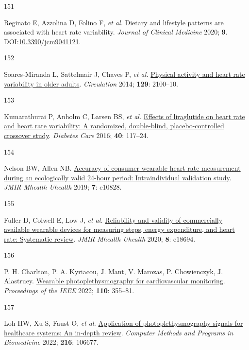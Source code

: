 \documentclass[
  letterpaper,
  headsepline=true,
  open=any]{scrbook}
\newlength{\cslhangindent}
\newlength{\csllabelwidth}
\newlength{\cslentryspacingunit} %
\newenvironment{CSLReferences}[2] %
 {%
  \setlength{\parindent}{0pt}
  \ifodd #1
  \let\oldpar\par
  \def\par{\hangindent=\cslhangindent\oldpar}
  \fi
  \setlength{\parskip}{#2\cslentryspacingunit}
 }%
 {}
\newcommand{\CSLLeftMargin}[1]{\parbox[t]{\csllabelwidth}{#1}}
\newcommand{\CSLRightInline}[1]{\parbox[t]{\linewidth - \csllabelwidth}{#1}\break}
\begin{document}
\begin{CSLReferences}{0}{0}
\leavevmode{}%
\CSLLeftMargin{151 }%
\CSLRightInline{Reginato E, Azzolina D, Folino F, \emph{et al.} Dietary
and lifestyle patterns are associated with heart rate variability.
\emph{Journal of Clinical Medicine} 2020; \textbf{9}.
DOI:\href{https://doi.org/10.3390/jcm9041121}{10.3390/jcm9041121}.}

\leavevmode{}%
\CSLLeftMargin{152 }%
\CSLRightInline{Soares-Miranda L, Sattelmair J, Chaves P, \emph{et al.}
\href{https://doi.org/10.1161/CIRCULATIONAHA.113.005361}{Physical
activity and heart rate variability in older adults}. \emph{Circulation}
2014; \textbf{129}: 2100--10.}

\leavevmode{}%
\CSLLeftMargin{153 }%
\CSLRightInline{Kumarathurai P, Anholm C, Larsen BS, \emph{et al.}
\href{https://doi.org/10.2337/dc16-1580}{Effects of liraglutide on heart
rate and heart rate variability: A randomized, double-blind,
placebo-controlled crossover study}. \emph{Diabetes Care} 2016;
\textbf{40}: 117--24.}

\leavevmode{}%
\CSLLeftMargin{154 }%
\CSLRightInline{Nelson BW, Allen NB.
\href{https://doi.org/10.2196/10828}{Accuracy of consumer wearable heart
rate measurement during an ecologically valid 24-hour period:
Intraindividual validation study}. \emph{JMIR Mhealth Uhealth} 2019;
\textbf{7}: e10828.}

\leavevmode{}%
\CSLLeftMargin{155 }%
\CSLRightInline{Fuller D, Colwell E, Low J, \emph{et al.}
\href{https://doi.org/10.2196/18694}{Reliability and validity of
commercially available wearable devices for measuring steps, energy
expenditure, and heart rate: Systematic review}. \emph{JMIR Mhealth
Uhealth} 2020; \textbf{8}: e18694.}

\leavevmode{}%
\CSLLeftMargin{156 }%
\CSLRightInline{P. H. Charlton, P. A. Kyriacou, J. Mant, V. Marozas, P.
Chowienczyk, J. Alastruey.
\href{https://doi.org/10.1109/JPROC.2022.3149785}{Wearable
photoplethysmography for cardiovascular monitoring}. \emph{Proceedings
of the IEEE} 2022; \textbf{110}: 355--81.}

\leavevmode{}%
\CSLLeftMargin{157 }%
\CSLRightInline{Loh HW, Xu S, Faust O, \emph{et al.}
\href{https://doi.org/10.1016/j.cmpb.2022.106677}{Application of
photoplethysmography signals for healthcare systems: An in-depth
review}. \emph{Computer Methods and Programs in Biomedicine} 2022;
\textbf{216}: 106677.}


\end{CSLReferences}
\end{document}
